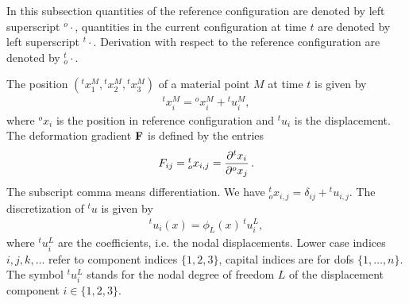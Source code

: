In this subsection quantities of the reference configuration are denoted by left superscript ${}^o{\cdot}$, quantities in the current configuration at time $t$ are denoted by left superscript ${}^t{\cdot}$. Derivation with respect to the reference configuration are denoted by ${}^{t}_o{\cdot}$.

The position $({}^tx_1^M,{}^tx_2^M,{}^tx_3^M)$ of a material point $M$ at time $t$ is given by
\begin{equation*}
  \begin{array}{lll}
    {}^tx_i^M = {}^ox_i^M + {}^tu_i^M,
  \end{array}
\end{equation*}
where ${}^ox_i$ is the position in reference configuration and ${}^tu_i$ is the displacement. The deformation gradient $\textbf{F}$ is defined by the entries
\begin{equation*}
  \begin{array}{lll}
    F_{ij} = {}^t_ox_{i,j} = \p{{}^tx_i}{{}^ox_j}.
  \end{array}
\end{equation*}
The subscript comma means differentiation. We have ${}^t_ox_{i,j} = \delta_{ij} + {}^ tu_{i,j}$. 
The discretization of $^{t}u$ is given by
\begin{equation*}
  \begin{array}{lll}
    {}^tu_i(x) = \phi_L(x)\,{}^tu_i^L,
  \end{array}
\end{equation*}
where ${}^tu_i^L$ are the coefficients, i.e. the nodal displacements. Lower case indices $i,j,k,\dots$ refer to component indices $\{1,2,3\}$, capital indices are for dofs $\{1,\dots,n\}$. 
The symbol ${}^tu_i^L$ stands for the nodal degree of freedom $L$ of the displacement component $i\in \{1,2,3\}$.

